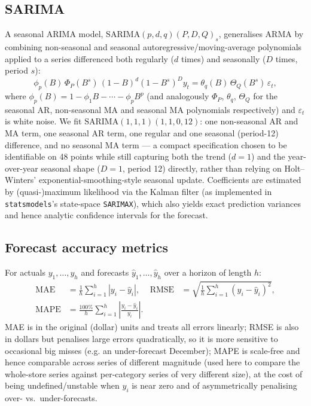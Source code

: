 \subsection{SARIMA}
A seasonal ARIMA model, $\mathrm{SARIMA}(p,d,q)(P,D,Q)_s$, generalises
ARMA by combining non-seasonal and seasonal autoregressive/moving-average
polynomials applied to a series differenced both regularly ($d$ times)
and seasonally ($D$ times, period $s$):
\begin{equation}
  \phi_p(B)\,\Phi_P(B^s)\, (1-B)^d (1-B^s)^D y_t
    = \theta_q(B)\,\Theta_Q(B^s)\,\varepsilon_t,
  \label{eq:sarima}
\end{equation}
where $\phi_p(B) = 1-\phi_1 B - \cdots - \phi_p B^p$ (and analogously
$\Phi_P$, $\theta_q$, $\Theta_Q$ for the seasonal AR, non-seasonal MA and
seasonal MA polynomials respectively) and $\varepsilon_t$ is white noise.
We fit $\mathrm{SARIMA}(1,1,1)(1,1,0,12)$: one non-seasonal AR and MA
term, one seasonal AR term, one regular and one seasonal (period-12)
difference, and no seasonal MA term — a compact specification chosen to
be identifiable on 48 points while still capturing both the trend
($d=1$) and the year-over-year seasonal shape ($D=1$, period 12) directly,
rather than relying on Holt--Winters' exponential-smoothing-style
seasonal update. Coefficients are estimated by (quasi-)maximum likelihood
via the Kalman filter (as implemented in \texttt{statsmodels}'s
state-space \texttt{SARIMAX}), which also yields exact prediction
variances and hence analytic confidence intervals for the forecast.

\subsection{Forecast accuracy metrics}
For actuals $y_1,\dots,y_h$ and forecasts $\hat y_1,\dots,\hat y_h$ over a
horizon of length $h$:
\begin{align}
  \mathrm{MAE} &= \frac1h\sum_{i=1}^h |y_i - \hat y_i|, &
  \mathrm{RMSE} &= \sqrt{\frac1h\sum_{i=1}^h (y_i-\hat y_i)^2}, \\
  \mathrm{MAPE} &= \frac{100\%}{h}\sum_{i=1}^h \left|\frac{y_i-\hat y_i}{y_i}\right|. &&
\end{align}
MAE is in the original (dollar) units and treats all errors linearly;
RMSE is also in dollars but penalises large errors quadratically, so it
is more sensitive to occasional big misses (e.g. an under-forecast
December); MAPE is scale-free and hence comparable across series of
different magnitude (used here to compare the whole-store series against
per-category series of very different size), at the cost of being
undefined/unstable when $y_i$ is near zero and of asymmetrically
penalising over- vs.\ under-forecasts.

